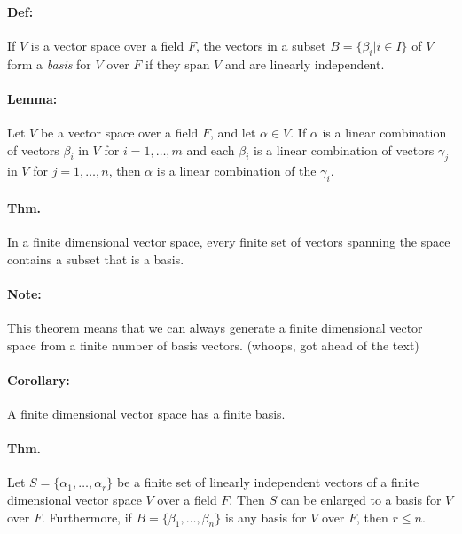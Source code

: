 \documentclass[10pt,a4paper]{article}
\begin{document}
\paragraph{Def:} If $V$ is a vector space over a field $F$, the vectors in a subset $B = \{ \beta_i | i \in I \}$ of $V$ form a \textit{basis} for $V$ over $F$ if they span $V$ and are linearly independent.

\paragraph{Lemma:} Let $V$ be a vector space over a field $F$, and let $\alpha \in V$. If $\alpha$ is a linear combination of vectors $\beta_i$ in $V$ for $i=1,\dots,m$ and each $\beta_i$ is a linear combination of vectors $\gamma_j$ in $V$ for $j=1,\dots,n$, then $\alpha$ is a linear combination of the $\gamma_i$.

\paragraph{Thm.} In a finite dimensional vector space, every finite set of vectors spanning the space contains a subset that is a basis.

\paragraph{Note:} This theorem means that we can always generate a finite dimensional vector space from a finite number of basis vectors. (whoops, got ahead of the text)

\paragraph{Corollary:} A finite dimensional vector space has a finite basis.

\paragraph{Thm.} Let $S = \{\alpha_1,\dots,\alpha_r\}$ be a finite set of linearly independent vectors of a finite dimensional vector space $V$ over a field $F$. Then $S$ can be enlarged to a basis for $V$ over $F$. Furthermore, if $B = \{\beta_1, \dots, \beta_n\}$ is any basis for $V$ over $F$, then $r \leq n$.
\end{document}
